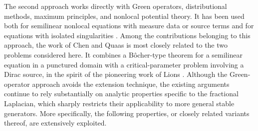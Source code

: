 \documentclass[11pt,a4paper,reqno]{amsart}
\theoremstyle{definition}
\numberwithin{equation}{section}
\begin{document}
The second approach works directly with Green operators, distributional
methods, maximum principles, and nonlocal potential theory. It has been used
both for semilinear nonlocal equations with measure data or source terms
\cite{lit:ChenVeron2014,GV,lit:HuynhNguyen2023,KR:CM}
and for equations with isolated singularities
\cite{lit:ChenQuaas2018,LiLiuWuXu2020,LiWuXu2018}.
Among the contributions belonging to this approach, the work of Chen and Quaas \cite{lit:ChenQuaas2018}
is most closely related to the two problems considered here. It combines a B\^ocher-type theorem for a semilinear equation
in a punctured domain with a critical-parameter problem involving a Dirac source, 
in the spirit of the pioneering work of Lions \cite{lit:Lions1980}. 
Although the Green-operator approach avoids the extension technique, the existing arguments continue to rely substantially 
on analytic properties specific to the fractional Laplacian, which sharply restricts their applicability to more general stable generators.
More specifically, the following properties, or closely related variants thereof, are
extensively exploited.
\end{document}
